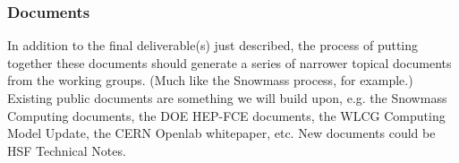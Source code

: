 \begin{frame}
\frametitle{Documents}

In addition to the final deliverable(s) just described, the process of putting together these documents should generate a series of narrower topical documents from the working groups. (Much like the Snowmass process, for example.)
\vskip 0.15in
Existing public documents are something we will build upon, e.g. the Snowmass Computing documents, the DOE HEP-FCE documents, the WLCG Computing Model Update, the CERN Openlab whitepaper, etc.
\vskip 0.15in
New documents could be HSF Technical Notes.

\end{frame}


